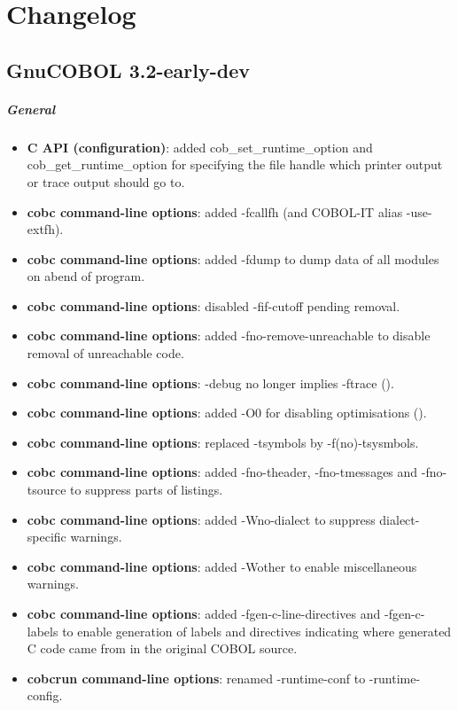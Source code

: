 \chapter{Changelog}

\section{GnuCOBOL 3.2-early-dev}

\paragraph{General}
\begin{itemize}
\item \textbf{C API (configuration)}: added cob\_set\_runtime\_option and cob\_get\_runtime\_option for specifying the file handle which printer output or trace output should go to.
\item \textbf{cobc command-line options}: added -fcallfh (and COBOL-IT alias -use-extfh).
\item \textbf{cobc command-line options}: added -fdump to dump data of all modules on abend of program.
\item \textbf{cobc command-line options}: disabled -fif-cutoff pending removal.
\item \textbf{cobc command-line options}: added -fno-remove-unreachable to disable removal of unreachable code.
\item \textbf{cobc command-line options}: -debug no longer implies -ftrace ().
\item \textbf{cobc command-line options}: added -O0 for disabling optimisations ().
\item \textbf{cobc command-line options}: replaced -tsymbols by -f(no)-tsysmbols.
\item \textbf{cobc command-line options}: added -fno-theader, -fno-tmessages and -fno-tsource to suppress parts of listings.
\item \textbf{cobc command-line options}: added -Wno-dialect to suppress dialect-specific warnings.
\item \textbf{cobc command-line options}: added -Wother to enable miscellaneous warnings.
\item \textbf{cobc command-line options}: added -fgen-c-line-directives and -fgen-c-labels to enable generation of labels and directives indicating where generated C code came from in the original COBOL source.
\item \textbf{cobcrun command-line options}: renamed -runtime-conf to -runtime-config.

\end{itemize}
